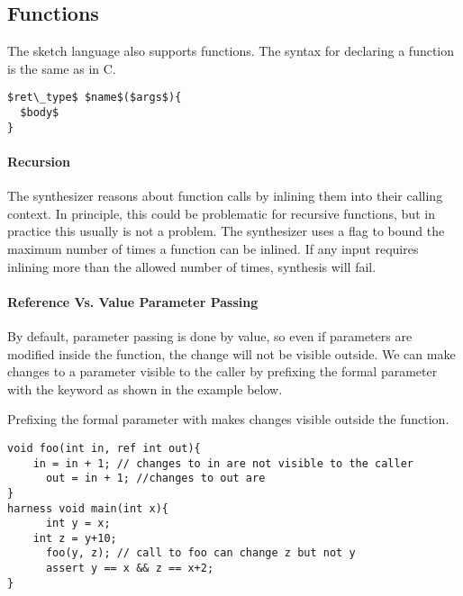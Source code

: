 \subsection{Functions}
The sketch language also supports functions. The syntax for declaring a function is the same as in C.

\begin{lstlisting}
$ret\_type$ $name$($args$){
  $body$
}
\end{lstlisting}

\paragraph{Recursion}
The synthesizer reasons about function calls by inlining them into their calling context. In principle, this could be problematic for recursive functions, but in practice this usually is not a problem. The synthesizer uses a flag  to bound the maximum number of times a function can be inlined. If any input requires inlining more than the allowed number of times, synthesis will fail.




\paragraph{Reference Vs. Value Parameter Passing}
By default, parameter passing is done by value, so even if parameters are modified inside the function, the change will not be visible outside. We can make changes to a parameter visible to the caller by prefixing the formal parameter with the keyword  as shown in the example below.

\begin{Example}
Prefixing the formal parameter with  makes changes visible outside the function.
\begin{lstlisting}
void foo(int in, ref int out){
	in = in + 1; // changes to in are not visible to the caller
      out = in + 1; //changes to out are
}
harness void main(int x){
      int y = x;
	int z = y+10;
      foo(y, z); // call to foo can change z but not y
      assert y == x && z == x+2;
}
\end{lstlisting}
\end{Example}

